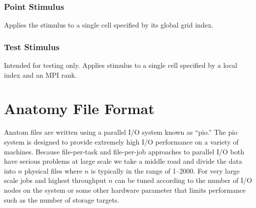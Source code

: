 \documentclass{article}
\begin{document}
\subsubsection{Point Stimulus}
Applies the stimulus to a single cell specified by its global grid index.

\begin{keywords}
\end{keywords}

\subsubsection{Test Stimulus}
Intended for testing only.  Applies stimulus to a single cell specified
by a local index and an MPI rank.

\begin{keywords}
\end{keywords}



\section{Anatomy File Format}
\label{sec:AnatomyFormat}

Anatom files are written using a parallel I/O system known as ``pio.''
The pio system is designed to provide extremely high I/O performance on
a variety of machines.  Because file-per-task and file-per-job
approaches to parallel I/O both have serious problems at large scale we
take a middle road and divide the data into $n$ physical files where $n$
is typically in the range of 1--2000.  For very large scale jobs and
highest throughput $n$ can be tuned according to the number of I/O nodes
on the system or some other hardware parameter that limits performance
such as the number of storage targets.
\end{document}
